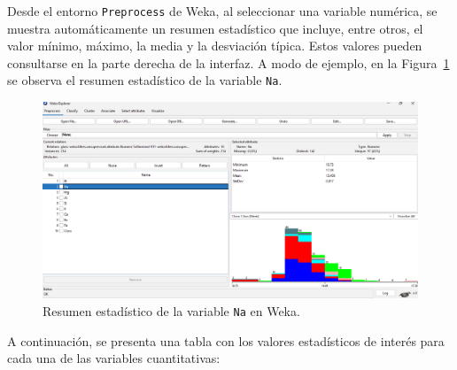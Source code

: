 \documentclass{article}
\begin{document}

Desde el entorno \texttt{Preprocess} de Weka, al seleccionar una variable numérica, se muestra automáticamente un resumen estadístico que incluye, entre otros, el valor mínimo, máximo, la media y la desviación típica. Estos valores pueden consultarse en la parte derecha de la interfaz. A modo de ejemplo, en la Figura~\ref{fig:weka-stats} se observa el resumen estadístico de la variable \texttt{Na}.\\

\begin{figure}[!ht]
    \centering
    \includegraphics[width=1\linewidth]{Imágenes/weka-stats.png}
    \caption{Resumen estadístico de la variable \texttt{Na} en Weka.}
    \label{fig:weka-stats}
\end{figure}


A continuación, se presenta una tabla con los valores estadísticos de interés para cada una de las variables cuantitativas:
\end{document}
